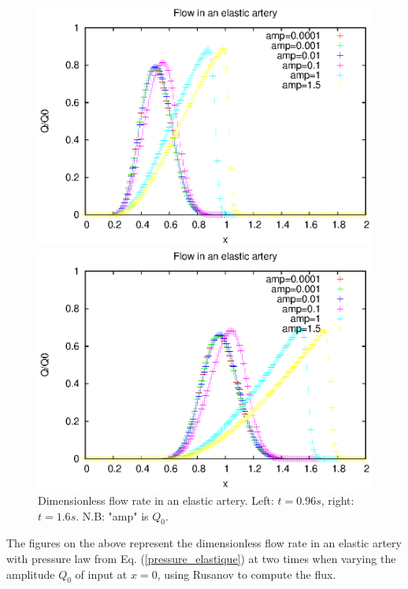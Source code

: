 \documentclass{config}
\begin{document}
\begin{figure}[H]
   \begin{minipage}[c]{.46\linewidth}
     \includegraphics[scale=0.7]{figures/Q_elt1.eps}
   \end{minipage} \hfill
   \begin{minipage}[c]{.46\linewidth}
\includegraphics[scale=0.7]{figures/Q_elt2.eps}
   \end{minipage}
   \caption{Dimensionless flow rate in an elastic artery. Left: $t=0.96 s$, right: $t=1.6s$. N.B: "amp" is $Q_0$.}
   \label{Q_elastic}
\end{figure}

The figures on the above represent the dimensionless flow rate in an elastic artery with pressure law from Eq. (\ref{pressure_elastique}) at two times when varying the amplitude $Q_0$ of input at $x=0$, using Rusanov to compute the flux. 
\end{document}
